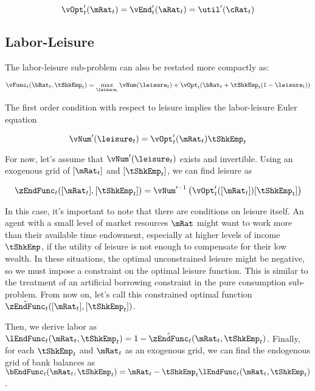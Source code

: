 \documentclass[\econtexRoot/SequentialEGM]{subfiles}
\begin{document}
\begin{equation}
        \vOpt_{t}'(\mRat_{t}) = \vEnd_{t}'(\aRat_{t}) = \util'(\cRat_{t})
\end{equation}

\subsection{Labor-Leisure}

The labor-leisure sub-problem can also be restated more compactly as:

\begin{equation}
        \vFunc_{t}(\bRat_{t}, \tShkEmp_{t}) = \max_{ \leisure_{t}}
        \vNum(\leisure_{t}) + \vOpt_{t}(\bRat_{t} +
        \tShkEmp_{t}(1-\leisure_{t}))
\end{equation}

The first order condition with respect to leisure implies the labor-leisure Euler equation

\begin{equation}
        \vNum'(\leisure_{t}) =	\vOpt_{t}'(\mRat_{t}) \tShkEmp_{t}
\end{equation}

For now, let's assume that $\vNum'(\leisure_{t})$ exists and invertible. Using
an exogenous grid of $[\mRat_{t}]$ and $[\tShkEmp_{t}]$, we can find leisure as


\begin{equation}
        \zEndFunc_{t}([\mRat_{t}], [\tShkEmp_{t}]) = \vNum'^{-1}\left(
        \vOpt_{t}'([\mRat_{t}]) [\tShkEmp_{t}] \right)
\end{equation}

In this case, it's important to note that there are conditions on leisure itself. An agent with a small level of market resources $\mRat$ might want to work more than their available time endowment, especially at higher levels of income $\tShkEmp$, if the utility of leisure is not enough to compensate for their low wealth. In these situations, the optimal unconstrained leisure might be negative, so we must impose a constraint on the optimal leisure function. This is similar to the treatment of an artificial borrowing constraint in the pure consumption sub-problem. From now on, let's call this constrained optimal function $\hat{\zEndFunc}_{t}([\mRat_{t}], [\tShkEmp_{t}])$.



Then, we derive labor as $\lEndFunc_{t}(\mRat_{t}, \tShkEmp_{t}) = 1 -
        \hat{\zEndFunc}_{t}(\mRat_{t}, \tShkEmp_{t})$. Finally, for each
$\tShkEmp_{t}$ and
$\mRat_{t}$ as an exogenous grid, we can find the endogenous grid of bank
balances as $\bEndFunc_{t}(\mRat_{t}, \tShkEmp_{t}) = \mRat_{t} -
        \tShkEmp_{t}\lEndFunc_{t}(\mRat_{t}, \tShkEmp_{t})$.
\end{document}
